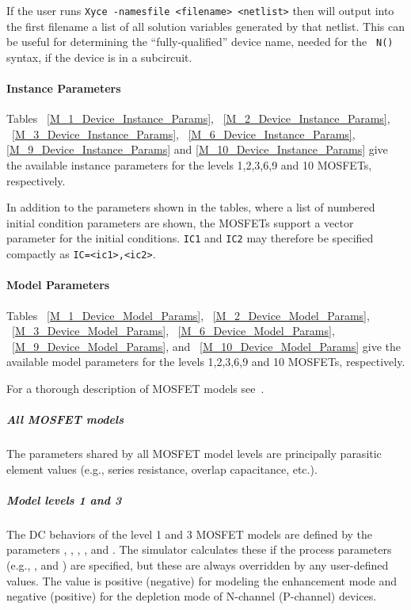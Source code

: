 If the user runs \texttt{Xyce -namesfile <filename> <netlist>} then
\Xyce{} will output into the first filename a list of all solution
variables generated by that netlist. This can be useful for
determining the ``fully-qualified'' device name, needed for the {\tt
  N()} syntax, if the device is in a subcircuit.

\paragraph{Instance Parameters}
Tables ~\ref{M_1_Device_Instance_Params}, ~\ref{M_2_Device_Instance_Params}, 
~\ref{M_3_Device_Instance_Params},  ~\ref{M_6_Device_Instance_Params},
\ref{M_9_Device_Instance_Params} and \ref{M_10_Device_Instance_Params}  
give the available instance parameters for the levels 1,2,3,6,9 and 10 MOSFETs,
respectively.

In addition to the parameters shown in the tables, where a list of
numbered initial condition parameters are shown, the MOSFETs support a vector
parameter for the initial conditions.  \texttt{IC1} and \texttt{IC2}
may therefore be specified compactly as \texttt{IC=<ic1>,<ic2>}.

\paragraph{Model Parameters}
Tables ~\ref{M_1_Device_Model_Params}, ~\ref{M_2_Device_Model_Params},
~\ref{M_3_Device_Model_Params}, ~\ref{M_6_Device_Model_Params},
~\ref{M_9_Device_Model_Params}, and ~\ref{M_10_Device_Model_Params}
give the available model parameters for the levels 1,2,3,6,9 and 10 MOSFETs,
respectively.

For a thorough description of MOSFET models see~\cite{Antognetti:1988, HLJHCKH,
BLETK:1997, SH:1968, VL:1980,
SSKJ:1987, Pierret:1984, YEC:1983, BSIM3:V3:1, BN}.

\subparagraph{All MOSFET models}
The parameters shared by all MOSFET model levels are principally parasitic
element values (e.g., series resistance, overlap capacitance, etc.).

\subparagraph{Model levels 1 and 3}
The DC behaviors of the level 1 and 3 MOSFET models are defined by the
parameters , , , , and
.  The simulator calculates these if the process parameters
(e.g., , and ) are specified, but these are always
overridden by any user-defined values. The  value is positive
(negative) for modeling the enhancement mode and negative (positive) for the
depletion mode of N-channel (P-channel) devices.


